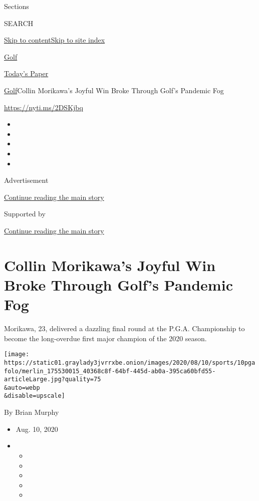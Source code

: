 Sections

SEARCH

\protect\hyperlink{site-content}{Skip to
content}\protect\hyperlink{site-index}{Skip to site index}

\href{https://www.nytimes3xbfgragh.onion/section/sports/golf}{Golf}

\href{https://myaccount.nytimes3xbfgragh.onion/auth/login?response_type=cookie\&client_id=vi}{}

\href{https://www.nytimes3xbfgragh.onion/section/todayspaper}{Today's
Paper}

\href{/section/sports/golf}{Golf}\textbar{}Collin Morikawa's Joyful Win
Broke Through Golf's Pandemic Fog

\url{https://nyti.ms/2DSKjbq}

\begin{itemize}
\item
\item
\item
\item
\item
\end{itemize}

Advertisement

\protect\hyperlink{after-top}{Continue reading the main story}

Supported by

\protect\hyperlink{after-sponsor}{Continue reading the main story}

\hypertarget{collin-morikawas-joyful-win-broke-through-golfs-pandemic-fog}{%
\section{Collin Morikawa's Joyful Win Broke Through Golf's Pandemic
Fog}\label{collin-morikawas-joyful-win-broke-through-golfs-pandemic-fog}}

Morikawa, 23, delivered a dazzling final round at the P.G.A.
Championship to become the long-overdue first major champion of the 2020
season.

\texttt{[image: https://static01.graylady3jvrrxbe.onion/images/2020/08/10/sports/10pgafolo/merlin\_175530015\_40368c8f-64bf-445d-ab0a-395ca60bfd55-articleLarge.jpg?quality=75\\\&auto=webp\\\&disable=upscale]}

By Brian Murphy

\begin{itemize}
\item
  Aug. 10, 2020
\item
  \begin{itemize}
  \item
  \item
  \item
  \item
  \item
  \end{itemize}
\end{itemize}

